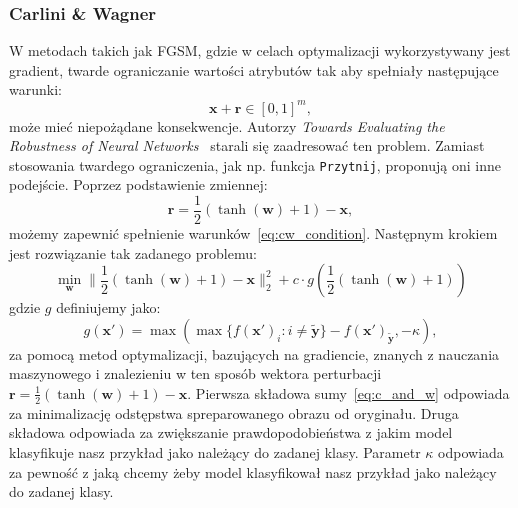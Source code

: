 \documentclass[
    left=2.5cm,         %
    right=2.5cm,        %
    top=2.5cm,          %
    bottom=3cm,         %
    bindingoffset=6mm,  %
    nohyphenation=false %
]{eiti/eiti-thesis}
\renewcommand{\vec}[1]{\mathbf{#1}}
\newcommand{\function}[1]{\texttt{#1}}
\begin{document}
\subsubsection{Carlini \& Wagner}
W metodach takich jak FGSM, gdzie w celach optymalizacji wykorzystywany jest gradient, twarde ograniczanie wartości atrybutów
tak aby spełniały następujące warunki:
\begin{equation}\label{eq:cw_condition}
    \vec{x}+\vec{r} \in [0,1]^m,
\end{equation}
może mieć niepożądane konsekwencje.
Autorzy \textit{Towards Evaluating the Robustness of Neural Networks}~\cite{DBLP:journals/corr/CarliniW16a} starali się zaadresować ten problem.
Zamiast stosowania twardego ograniczenia, jak np. funkcja \function{Przytnij}, proponują oni inne podejście.
Poprzez podstawienie zmiennej:
\begin{equation}
    \vec{r} = \frac{1}{2}(\tanh(\vec{w})+1) - \vec{x},
\end{equation}
możemy zapewnić spełnienie warunków~\eqref{eq:cw_condition}.
Następnym krokiem jest rozwiązanie tak zadanego problemu:
\begin{equation}\label{eq:c_and_w}
\min_{\vec{w}}\| \frac { 1 } { 2 } ( \tanh ( \vec{w} ) + 1 ) - \vec{x} \| _ { 2 } ^ { 2 } + c \cdot g ( \frac { 1 } { 2 } ( \tanh ( \vec{w} ) + 1 ) )
\end{equation}
gdzie $g$ definiujemy jako:
\begin{equation}
    g ( \vec{x'} ) = \max ( \max \{ f ( \vec{x'} ) _ { i } : i \neq \vec{\widetilde{y}} \} - f ( \vec{x'} ) _ { \vec{\widetilde{y}} } , - \kappa),
\end{equation}
za pomocą metod optymalizacji, bazujących na gradiencie, znanych z nauczania maszynowego i znalezieniu w ten sposób wektora
perturbacji $\vec{r} = \frac{1}{2}(\tanh(\vec{w})+1) - \vec{x}$.
Pierwsza składowa sumy~\eqref{eq:c_and_w} odpowiada za minimalizację odstępstwa spreparowanego obrazu
od oryginału. Druga składowa odpowiada za zwiększanie prawdopodobieństwa z jakim model klasyfikuje nasz przykład
jako należący do zadanej klasy. Parametr \(\kappa\) odpowiada za pewność z jaką chcemy żeby model klasyfikował nasz
przykład jako należący do zadanej klasy.


\end{document}
